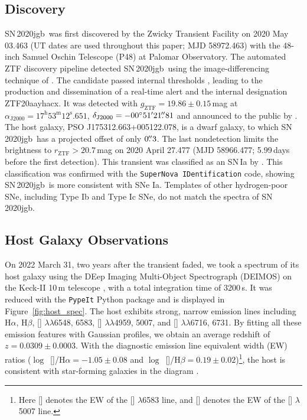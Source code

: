 \documentclass[twocolumn]{aastex631}
\newcommand{\sn}{SN\,2020jgb}
\begin{document}
\subsection{Discovery}

\sn\ was first discovered by the Zwicky Transient Facility \citep[ZTF;][]{Bellm_ZTF_2019a,Graham_ZTF_2019, Dekany_ZTF_2020} on 2020 May 03.463 (UT dates are used throughout this paper; MJD 58972.463) with the 48-inch Samuel Oschin Telescope (P48) at Palomar Observatory. The automated ZTF discovery pipeline \citep{Masci_ZTF_2019} detected \sn\ using the image-differencing technique of \citet{Zackay_imagesub_2016}. The candidate passed internal thresholds \citep[e.g.,][]{Mahabal_ZTFML_2019, Duev_ZTFML_2019}, leading to the production and dissemination of a real-time alert \citep{Patterson_ZTFalert_2019} and the internal designation ZTF20aayhacx. It was detected with $g_\mathrm{ZTF} = 19.86 \pm 0.15\,$mag at $\alpha_\mathrm{J2000}=17^\mathrm{h}53^\mathrm{m}12^\mathrm{s}.651$, $\delta_\mathrm{J2000}=-00^\circ51'21\mbox{$.\!\!^{\prime\prime}$}{81}$ and announced to the public by \citet{Fremling_report_2020}. The host galaxy, PSO J175312.663+005122.078, is a dwarf galaxy, to which \sn\ has a projected offset of only $0\mbox{$.\!\!^{\prime\prime}$}3$. The last nondetection limits the brightness to $r_\mathrm{ZTF} > 20.7$\,mag on 2020 April 27.477 (MJD 58966.477; 5.99\,days before the first detection). This transient was classified as an SN\,Ia by \citet{TNS_2020}. This classification was confirmed with the \texttt{SuperNova IDentification} \citep[\texttt{SNID};][]{Blondin_SNID_2007} code, showing \sn\ is more consistent with SNe Ia. Templates of other hydrogen-poor SNe, including Type Ib and Type Ic SNe, do not match the spectra of \sn.

\subsection{Host Galaxy Observations}
On 2022 March 31, two years after the transient faded, we took a spectrum of its host galaxy using the DEep Imaging Multi-Object Spectrograph (DEIMOS) on the Keck-II 10\,m telescope \citep{DEIMOS_2003}, with a total integration time of 3200\,s. It was reduced with the \texttt{PypeIt} Python package \citep{pypeit:joss_pub} and is displayed in Figure~\ref{fig:host_spec}. 
The host exhibits strong, narrow emission lines including H$\alpha$, H$\beta$, [] $\lambda\lambda$6548, 6583, [] $\lambda\lambda$4959, 5007, and [] $\lambda\lambda$6716, 6731. By fitting all these emission features with Gaussian profiles, we obtain an average redshift of $z=0.0309\pm0.0003$. With the diagnostic emission line equivalent width (EW) ratios ($\log$~[]/H$\alpha=-1.05\pm0.08$ and $\log$~[]/H$\beta=0.19\pm0.02$)\footnote{Here [] denotes the EW of the [] $\lambda$6583 line, and [] denotes the EW of the [] $\lambda$5007 line.}, the host is consistent with star-forming galaxies in the \citet[][hereafter BPT]{BPT_1981} diagram \citep[see also][]{Veilleux_1987}. 
\end{document}
